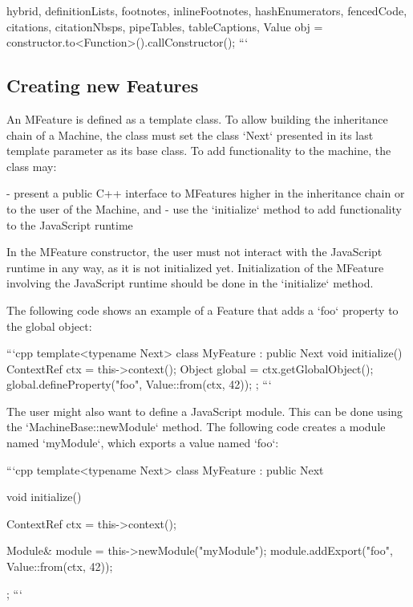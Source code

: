 \begin{markdown*}{%
  hybrid,
  definitionLists,
  footnotes,
  inlineFootnotes,
  hashEnumerators,
  fencedCode,
  citations,
  citationNbsps,
  pipeTables,
  tableCaptions,
}
Value obj = constructor.to<Function>().callConstructor();
```

\subsection{Creating new Features}

An MFeature is defined as a template class. To allow building the inheritance chain of a Machine, the class must set the class `Next` presented in its last template parameter as its base class. To add functionality to the machine, the class may:

  - present a public C++ interface to MFeatures higher in the inheritance chain or to the user of the Machine, and
  - use the `initialize` method to add functionality to the JavaScript runtime

In the MFeature constructor, the user must not interact with the JavaScript runtime in any way, as it is not initialized yet. Initialization of the MFeature involving the JavaScript runtime should be done in the `initialize` method.

The following code shows an example of a Feature that adds a `foo` property to the global object:

```cpp
template<typename Next>
class MyFeature : public Next {
    void initialize() {
        ContextRef ctx = this->context();
        Object global = ctx.getGlobalObject();
        global.defineProperty("foo", Value::from(ctx, 42));
    }
};
```

The user might also want to define a JavaScript module. This can be done using the `MachineBase::newModule` method. The following code creates a module named `myModule`, which exports a value named `foo`:

```cpp
template<typename Next>
class MyFeature : public Next {
    void initialize() {
        ContextRef ctx = this->context();

        Module& module = this->newModule("myModule");
        module.addExport("foo", Value::from(ctx, 42));
    }
};
```


\end{markdown*}
